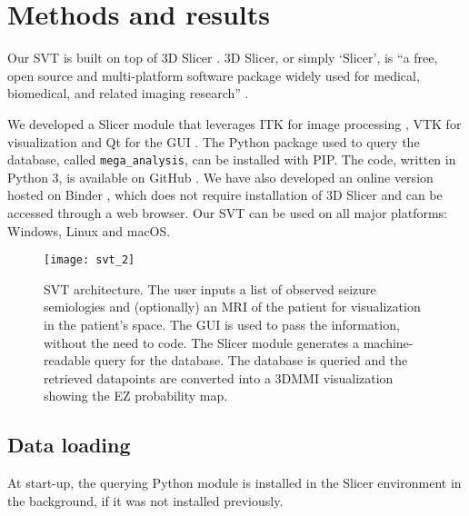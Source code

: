 \section{Methods and results}

Our \ac{SVT} is built on top of 3D Slicer \cite{fedorov_3d_2012}.
3D Slicer, or simply `Slicer', is ``a free, open source and multi-platform software package widely used for medical, biomedical, and related imaging research''%
.

We developed a Slicer module that leverages \ac{ITK} for image processing \cite{mccormick_itk_2014}, \ac{VTK} for visualization \cite{schroeder_visualization_2006} and Qt for the \ac{GUI}%
.
The Python package used to query the \svtdatabase database, called \texttt{mega\_analysis}, can be installed with \ac{PIP}.
The code, written in Python 3, is available on GitHub%
\fnurl{\svtgithub}.
We have also developed an online version hosted on Binder \cite{bussonnier_binder_2018}, which does not require installation of 3D Slicer and can be accessed through a web browser.
Our \ac{SVT} can be used on all major platforms: Windows, Linux and macOS.

\begin{figure}
  \centering
  \texttt{[image: svt\_2]}
  \caption[Systematic semiology literature review to build the \svtdatabase database]{
    \ac{SVT} architecture.
    The user inputs a list of observed seizure semiologies and (optionally) an \ac{MRI} of the patient for visualization in the patient's space.
    The \ac{GUI} is used to pass the information, without the need to code.
    The Slicer module generates a machine-readable query for the \svtdatabase database.
    The database is queried and the retrieved datapoints are converted into a \ac{3DMMI} visualization showing the \ac{EZ} probability map.
  }
  \label{fig:svt_architecture}
\end{figure}


\subsection{Data loading}

At start-up, the querying Python module is installed in the Slicer environment in the background, if it was not installed previously.

